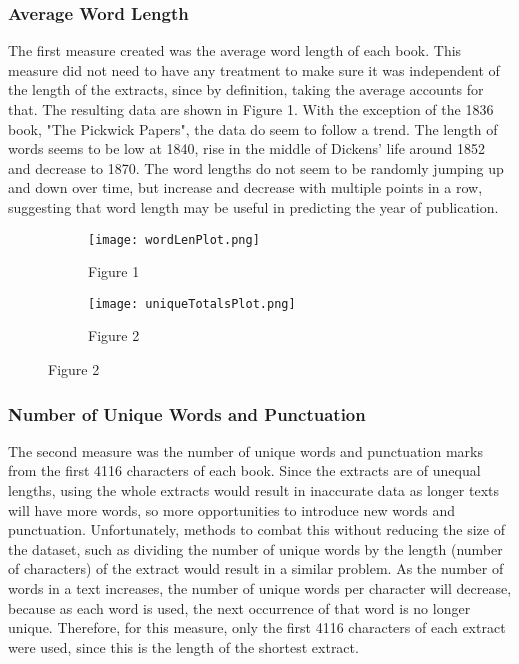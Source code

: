 \documentclass[11pt,a4paper,reqno]{amsart}
\begin{document}
\subsubsection{Average Word Length}
The first measure created was the average word length of each book. This measure did not need to have any treatment to make sure it was independent of the length of the extracts, since by definition, taking the average accounts for that. The resulting data are shown in Figure 1. With the exception of the 1836 book, "The Pickwick Papers", the data do seem to follow a trend. The length of words seems to be low at 1840, rise in the middle of Dickens' life around 1852 and decrease to 1870. The word lengths do not seem to be randomly jumping up and down over time, but increase and decrease with multiple points in a row, suggesting that word length may be useful in predicting the year of publication.

\begin{figure}[!h]
\centering
\begin{subfigure}{.5\textwidth}
  \centering
  \texttt{[image: wordLenPlot.png]}
  \caption*{Figure 1}
\end{subfigure}%
\begin{subfigure}{.5\textwidth}
  \centering
  \texttt{[image: uniqueTotalsPlot.png]}
  \caption*{Figure 2}
\end{subfigure}
\end{figure}

\subsubsection{Number of Unique Words and Punctuation}
The second measure was the number of unique words and punctuation marks from the first 4116 characters of each book. Since the extracts are of unequal lengths, using the whole extracts would result in inaccurate data as longer texts will have more words, so more opportunities to introduce new words and punctuation. Unfortunately, methods to combat this without reducing the size of the dataset, such as dividing the number of unique words by the length (number of characters) of the extract would result in a similar problem. As the number of words in a text increases, the number of unique words per character will decrease, because as each word is used, the next occurrence of that word is no longer unique. Therefore, for this measure, only the first 4116 characters of each extract were used, since this is the length of the shortest extract.
\end{document}
